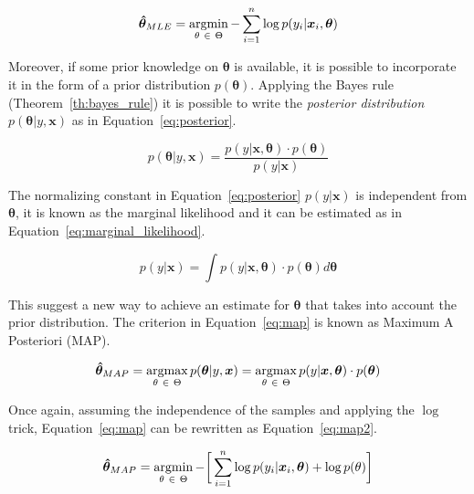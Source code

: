 \begin{equation} \label{eq:nll}
	\bm{\hat \theta}_{MLE} = \mathop{\mathrm{argmin}}\limits_{\theta~\in~\Theta} - \sum_{i=1}^n \log p(y_i | \bm{x}_i, \bm{\theta})
\end{equation}

Moreover, if some prior knowledge on $\bm{\theta}$ is available, it is possible to incorporate it in the form of a prior distribution $p(\bm{\theta})$. Applying the Bayes rule (Theorem~\ref{th:bayes_rule}) it is possible to write the \textit{posterior distribution} $p(\bm{\theta}|y,\bm{x})$ as in Equation~\eqref{eq:posterior}.

\begin{equation} \label{eq:posterior}
	p(\bm{\theta}|y,\bm{x}) = \frac{p(y|\bm{x}, \bm{\theta}) \cdot p(\bm{\theta})}{p(y|\bm{x})}
\end{equation}

The normalizing constant in Equation~\eqref{eq:posterior} $p(y|\bm{x})$ is independent from $\bm{\theta}$, it is known as the marginal likelihood and it can be estimated as in Equation~\eqref{eq:marginal_likelihood}.

\begin{equation} \label{eq:marginal_likelihood}
	p(y|\bm{x}) = \int p(y|\bm{x}, \bm{\theta}) \cdot p(\bm{\theta}) d\bm{\theta}
\end{equation}

This suggest a new way to achieve an estimate for $\bm{\theta}$ that takes into account the prior distribution. The criterion in Equation~\eqref{eq:map} is known as Maximum A Posteriori (MAP).

\begin{equation} \label{eq:map}
	\bm{\hat \theta}_{MAP} = \mathop{\mathrm{argmax}}\limits_{\theta~\in~\Theta} p(\bm{\theta}|y,\bm{x}) = \mathop{\mathrm{argmax}}\limits_{\theta~\in~\Theta} p(y|\bm{x}, \bm{\theta}) \cdot p(\bm{\theta})
\end{equation}

Once again, assuming the independence of the samples and applying the $\log$ trick, Equation~\eqref{eq:map} can be rewritten as Equation~\eqref{eq:map2}.

\begin{equation} \label{eq:map2}
	\bm{\hat \theta}_{MAP} = \mathop{\mathrm{argmin}}\limits_{\theta~\in~\Theta} - \bigg[\sum_{i=1}^n \log p(y_i|\bm{x}_i,\bm{\theta})  + \log p(\theta)\bigg]
\end{equation}



